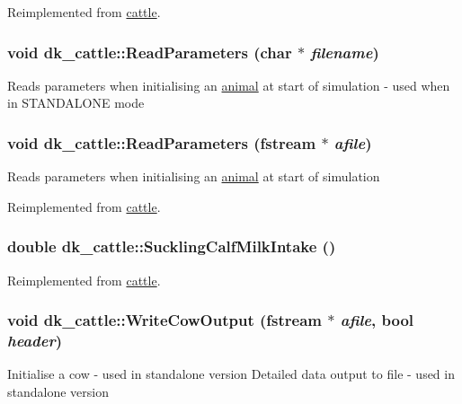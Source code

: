 Reimplemented from \hyperlink{classcattle_af6ad25c3e883a183b1470d6b7e534406}{cattle}.\hypertarget{classdk__cattle_a7dfcfa6feb07a5c7c1216701f60c367b}{
\subsubsection[{ReadParameters}]{\setlength{\rightskip}{0pt plus 5cm}void dk\_\-cattle::ReadParameters (char $\ast$ {\em filename})}}
\label{classdk__cattle_a7dfcfa6feb07a5c7c1216701f60c367b}
Reads parameters when initialising an \hyperlink{classanimal}{animal} at start of simulation -\/ used when in STANDALONE mode \hypertarget{classdk__cattle_a7b51caf022492f303671bc80780bc49c}{
\subsubsection[{ReadParameters}]{\setlength{\rightskip}{0pt plus 5cm}void dk\_\-cattle::ReadParameters (fstream $\ast$ {\em afile})}}
\label{classdk__cattle_a7b51caf022492f303671bc80780bc49c}
Reads parameters when initialising an \hyperlink{classanimal}{animal} at start of simulation 

Reimplemented from \hyperlink{classcattle_a13ca8c9803fc7d414933e0cacb5e398c}{cattle}.\hypertarget{classdk__cattle_a448e3a99c61a223770c53dd023e1a9da}{
\subsubsection[{SucklingCalfMilkIntake}]{\setlength{\rightskip}{0pt plus 5cm}double dk\_\-cattle::SucklingCalfMilkIntake ()}}
\label{classdk__cattle_a448e3a99c61a223770c53dd023e1a9da}


Reimplemented from \hyperlink{classcattle_ad2dd5d5a563d9b421d4c3cf46e563df3}{cattle}.\hypertarget{classdk__cattle_a8e14614bee3bdaa807a889d5c0b0625f}{
\subsubsection[{WriteCowOutput}]{\setlength{\rightskip}{0pt plus 5cm}void dk\_\-cattle::WriteCowOutput (fstream $\ast$ {\em afile}, \/  bool {\em header})}}
\label{classdk__cattle_a8e14614bee3bdaa807a889d5c0b0625f}
Initialise a cow -\/ used in standalone version Detailed data output to file -\/ used in standalone version 

